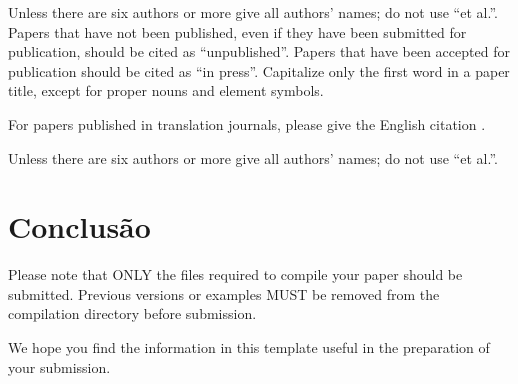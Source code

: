 \documentclass[a4paper,twoside]{article}
\begin{document}
Unless there are six authors or more give all authors’ names; do not use “et al.”. Papers that have not been published, even if they have been submitted for publication, should be cited as “unpublished”. Papers that have been accepted for publication should be cited as “in press”. Capitalize only the first word in a paper title, except for proper nouns and element symbols.


For papers published in translation journals, please give the English citation \cite{yorozu1987electron}.


Unless there are six authors or more give all authors’ names; do not use “et al.”.


\section*{Conclusão}
\label{sec:conclusion}

Please note that ONLY the files required to compile your paper should be submitted. Previous versions or examples MUST be removed from the compilation directory before submission.

We hope you find the information in this template useful in the preparation of your submission.


{\small
}



\vfill
\end{document}
